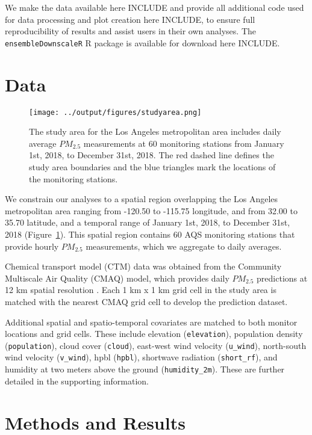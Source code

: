 \documentclass[12pt]{article}
\begin{document}
We make the data available here INCLUDE and provide all additional code used for data processing and plot creation here INCLUDE, to ensure full reproducibility of results and assist users in their own analyses. 
The \texttt{ensembleDownscaleR} R package is available for download here INCLUDE.

\section*{Data}

\begin{figure}[ht]
    \centering
    \texttt{[image: ../output/figures/studyarea.png]}
    \caption{The study area for the Los Angeles metropolitan area includes daily average $PM_{2.5}$ measurements at 60 monitoring stations from January 1st, 2018, to December 31st, 2018. The red dashed line defines the study area boundaries and the blue triangles mark the locations of the monitoring stations.}
    \label{fig:pltstudyarea}
\end{figure}
We constrain our analyses to a spatial region overlapping the Los Angeles metropolitan area ranging from -120.50 to -115.75 longitude, and from 32.00 to 35.70 latitude, and a temporal range of January 1st, 2018, to December 31st, 2018 (Figure~\ref{fig:pltstudyarea}).
This spatial region contains 60 AQS monitoring stations that provide hourly $PM_{2.5}$ measurements, which we aggregate to daily averages.

Chemical transport model (CTM) data was obtained from the Community Multiscale Air Quality (CMAQ) model, which provides daily $PM_{2.5}$ predictions at 12 km spatial resolution \cite{baker2016contribution}.
Each 1 km x 1 km grid cell in the study area is matched with the nearest CMAQ grid cell to develop the prediction dataset.

Additional spatial and spatio-temporal covariates are matched to both monitor locations and grid cells.
These include elevation (\texttt{elevation}), population density (\texttt{population}), cloud cover (\texttt{cloud}), east-west wind velocity (\texttt{u\_wind}), north-south wind velocity (\texttt{v\_wind}), hpbl (\texttt{hpbl}), shortwave radiation (\texttt{short\_rf}), and humidity at two meters above the ground (\texttt{humidity\_2m}).
These are further detailed in the supporting information.



\section*{Methods and Results}
\end{document}

